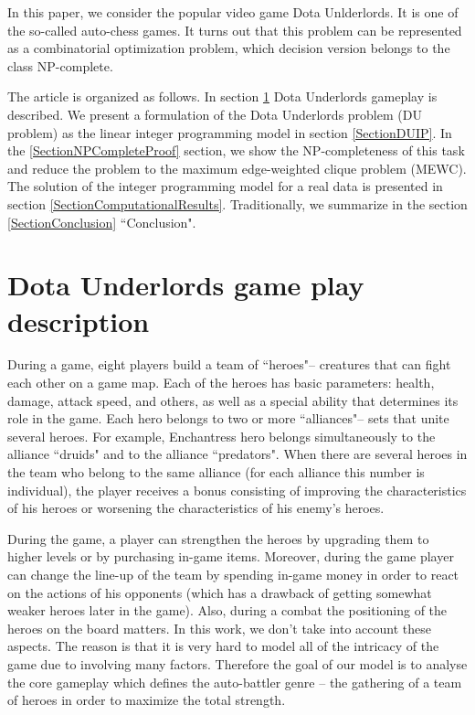 \documentclass[smallextended]{svjour3}       %
\begin{document}
In this paper, we consider the popular video game Dota Unlderlords. It is one of the so-called auto-chess games. It turns out that this problem can be represented as a combinatorial optimization problem, which decision version  belongs to the class NP-complete.

The article is organized as follows. In section \ref{SectionDUDescription} Dota Underlords gameplay is described.
We present a formulation of the Dota Underlords problem (DU problem) as the linear integer programming model in section \ref{SectionDUIP}. In the \ref{SectionNPCompleteProof} section, we show the NP-completeness of this task and reduce the problem to the maximum edge-weighted clique problem (MEWC). The solution of the integer programming model for a real data is presented in section \ref{SectionComputationalResults}. Traditionally, we summarize in the section \ref{SectionConclusion} ``Conclusion".

\section{Dota Underlords game play description}
\label{SectionDUDescription}

During a game, eight players build a team of ``heroes"-- creatures that can fight each other on a game map. Each of the heroes has basic parameters: health, damage, attack speed, and others, as well as a special ability that determines its role in the game. Each hero belongs to two or more ``alliances"-- sets that unite several heroes. For example, Enchantress hero belongs simultaneously to the alliance ``druids" and to the alliance ``predators". When there are several heroes in the team who belong to the same alliance (for each alliance this number is individual), the player receives a bonus consisting of improving the characteristics of his heroes or worsening the characteristics of his enemy's heroes.

During the game, a player can strengthen the heroes by upgrading them to higher levels or by purchasing in-game items. Moreover, during the game player can change the line-up of the team by spending in-game money in order to react on the actions of his opponents (which has a drawback of getting somewhat weaker heroes later in the game). Also, during a combat the positioning of the heroes on the board matters.  In this work, we don't take into account these aspects. The reason is that it is very hard to model all of the intricacy of the game due to involving many factors. Therefore the goal of our model is to analyse the core gameplay which defines the auto-battler genre -- the gathering of a team of heroes in order to maximize the total strength.
\end{document}
